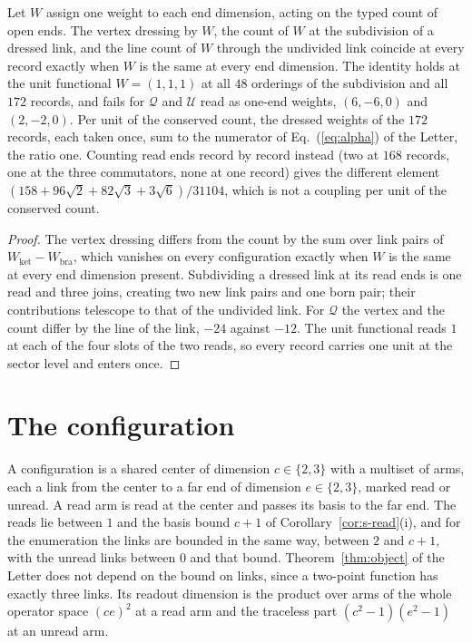 \begin{theorem}
\label{thm:s-ward}
Let $W$ assign one weight to each end dimension, acting on the typed count of open ends. The vertex dressing by $W$, the count of $W$ at the subdivision of a dressed link, and the line count of $W$ through the undivided link coincide at every record exactly when $W$ is the same at every end dimension. The identity holds at the unit functional $W=(1,1,1)$ at all $48$ orderings of the subdivision and all $172$ records, and fails for $\mathcal{Q}$ and $\mathcal{U}$ read as one-end weights, $(6,-6,0)$ and $(2,-2,0)$. Per unit of the conserved count, the dressed weights of the $172$ records, each taken once, sum to the numerator of Eq.~(\ref{eq:alpha}) of the Letter, the ratio one. Counting read ends record by record instead (two at $168$ records, one at the three commutators, none at one record) gives the different element $(158+96\sqrt{2}+82\sqrt{3}+3\sqrt{6})/31104$, which is not a coupling per unit of the conserved count.
\end{theorem}
\begin{proof}
The vertex dressing differs from the count by the sum over link pairs of $W_{\mathrm{ket}}-W_{\mathrm{bra}}$, which vanishes on every configuration exactly when $W$ is the same at every end dimension present. Subdividing a dressed link at its read ends is one read and three joins, creating two new link pairs and one born pair; their contributions telescope to that of the undivided link. For $\mathcal{Q}$ the vertex and the count differ by the line of the link, $-24$ against $-12$. The unit functional reads $1$ at each of the four slots of the two reads, so every record carries one unit at the sector level and enters once.
\end{proof}

\section{The configuration}
\label{sec:s-config}

A configuration is a shared center of dimension $c\in\{2,3\}$ with a multiset of arms, each a link from the center to a far end of dimension $e\in\{2,3\}$, marked read or unread. A read arm is read at the center and passes its basis to the far end. The reads lie between $1$ and the basis bound $c+1$ of Corollary~\ref{cor:s-read}(i), and for the enumeration the links are bounded in the same way, between $2$ and $c+1$, with the unread links between $0$ and that bound. Theorem~\ref{thm:object} of the Letter does not depend on the bound on links, since a two-point function has exactly three links. Its readout dimension is the product over arms of the whole operator space $(ce)^{2}$ at a read arm and the traceless part $(c^{2}-1)(e^{2}-1)$ at an unread arm.

